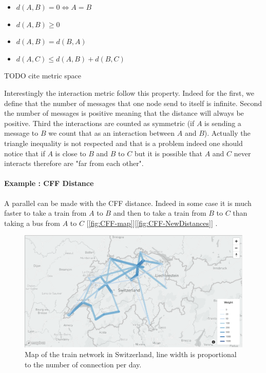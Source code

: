 \documentclass[a4paper,11pt,oneside]{report}
\begin{document}
\begin{itemize}
\item $d(A,B) = 0  \Leftrightarrow A = B$
\item $d(A,B) \geq 0$
\item $d(A,B) = d(B,A)$
\item \color{red} $d(A, C) \leq d(A,B) + d(B,C)$ \color{black}
\end{itemize}
\color{red} TODO cite metric space \color{black}

Interestingly the interaction metric follow this property. Indeed for the
first, we define that the number of messages that one node send to itself is
infinite. Second the number of messages is positive meaning that the distance
will always be positive. Third the interactions are counted as symmetric (if
$A$ is sending a message to $B$ we count that as an interaction between $A$ and
$B$). Actually the triangle inequality is not respected and that is a problem
indeed one should notice that if $A$ is close to $B$ and $B$ to $C$ but it is
possible that $A$ and $C$ never interacts therefore are "far from each other". 

\paragraph{Example :  CFF Distance}
A parallel can be made with the CFF distance. Indeed in some case it is much
faster to take a train from $A$ to $B$ and then to take a train from $B$ to $C$
than taking a bus from $A$ to $C$ [\autoref{fig:CFF-map}][\autoref{fig:CFF-NewDistances}] . 

\begin{figure}[!h] 
\centering
\includegraphics[width=450pt]{figures/CFF-map}
\caption{Map of the train network in Switzerland, line width is proportional to the number of connection per day.}
\label{fig:CFF-map}
\end{figure}
\end{document}
